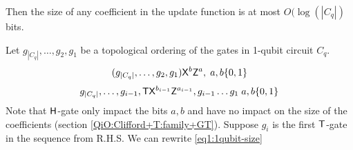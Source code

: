  
 Then the size of any coefficient in the update function is at most $O(\log(|C_q|)$ bits. 
 
 
 
 
 
 Let $g_{|C_q|},\dots, g_2,g_1$ be a topological ordering of the gates in 1-qubit circuit $C_q.$ \begin{equation}
 \label{eq2:1qubit-size}
 (g_{|C_q|},\dots, g_2,g_1) {\sf X} ^b {\sf Z}^a, \; a,b\{0,1\}
 \end{equation}
 \begin{equation}
 \label{eq3:1qubit-size}
 g_{|C_q|},\dots, g_{i-1},{\sf T} {\sf X} ^{b_{i-1}} {\sf Z}^{a_{i-1}},g_{i-1} \ldots g_1 \; a,b\{0,1\}
 \end{equation}
Note that ${\sf H}$-gate only impact the bits $a,b$ and have no impact on the size of the coefficients (section \ref{QiO:Clifford+T:family+GT}). Suppose $g_i$ is the first ${\sf T}$-gate in the sequence from R.H.S. We can rewrite \ref{eq1:1qubit-size}

